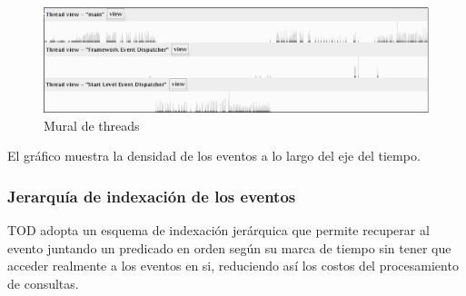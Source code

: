\documentclass[12pt,legalpaper]{report}
\begin{document}
\begin{figure}[h]
	\centering
	\includegraphics[scale=0.4]{images/TOD/ThreadMural.eps}
	\caption{Mural de threads}
	\label{threadMurals}
\end{figure}

El gráfico muestra la densidad de los eventos a lo largo del eje del tiempo.

			\subsubsection{Jerarquía de indexación de los eventos}

TOD adopta un esquema de indexación jerárquica que permite recuperar al evento juntando un predicado en orden según su marca de tiempo sin tener que acceder realmente a los eventos en si, reduciendo así los costos del procesamiento de consultas.
\end{document}
